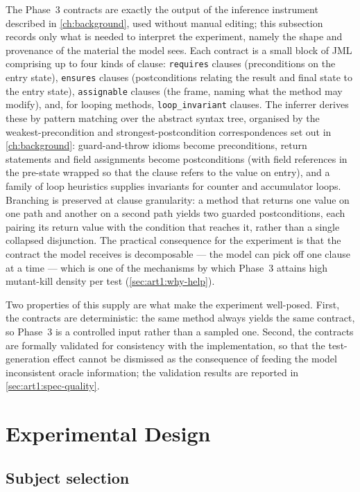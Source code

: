 The Phase~3 contracts are exactly the output of the inference instrument described
in \cref{ch:background}, used without manual editing; this subsection records only
what is needed to interpret the experiment, namely the shape and provenance of the
material the model sees. Each contract is a small block of JML comprising up to
four kinds of clause: \texttt{requires} clauses (preconditions on the entry state),
\texttt{ensures} clauses (postconditions relating the result and final state to
the entry state), \texttt{assignable} clauses (the frame, naming what the method
may modify), and, for looping methods, \texttt{loop\_invariant} clauses. The
inferrer derives these by pattern matching over the abstract syntax tree, organised
by the weakest-precondition and strongest-postcondition correspondences set out in
\cref{ch:background}: guard-and-throw idioms become preconditions, return
statements and field assignments become postconditions (with field references in
the pre-state wrapped so that the clause refers to the value on entry), and a
family of loop heuristics supplies invariants for counter and accumulator loops.
Branching is preserved at clause granularity: a method that returns one value on
one path and another on a second path yields two guarded postconditions, each
pairing its return value with the condition that reaches it, rather than a single
collapsed disjunction. The practical consequence for the experiment is that the
contract the model receives is decomposable --- the model can pick off one clause
at a time --- which is one of the mechanisms by which Phase~3 attains high
mutant-kill density per test (\cref{sec:art1:why-help}).

Two properties of this supply are what make the experiment well-posed. First, the
contracts are deterministic: the same method always yields the same contract, so
Phase~3 is a controlled input rather than a sampled one. Second, the contracts are
formally validated for consistency with the implementation, so that the
test-generation effect cannot be dismissed as the consequence of feeding the model
inconsistent oracle information; the validation results are reported in
\cref{sec:art1:spec-quality}.

\section{Experimental Design}
\label{sec:art1:design}

\subsection{Subject selection}
\label{sec:art1:subjects}

